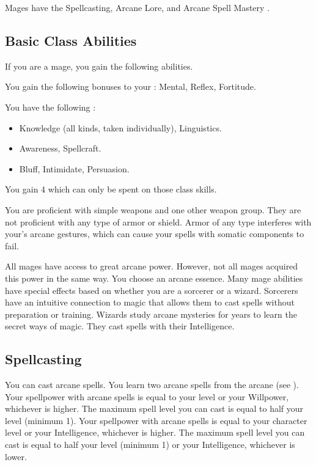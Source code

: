      Mages have the Spellcasting, Arcane Lore, and Arcane Spell Mastery .

    \subsection{Basic Class Abilities}
        If you are a mage, you gain the following abilities.

        You gain the following bonuses to your :  Mental,  Reflex,  Fortitude.

        You have the following :
        \begin{itemize}
            \item {} Knowledge (all kinds, taken individually), Linguistics.
            \item {} Awareness, Spellcraft.
            \item {} Bluff, Intimidate, Persuasion.
        \end{itemize}
        You gain 4  which can only be spent on those class skills.

        You are proficient with simple weapons and one other weapon group.
        They are not proficient with any type of armor or shield.
        Armor of any type interferes with your's arcane gestures, which can cause your spells with somatic components to fail.

        All mages have access to great arcane power.
        However, not all mages acquired this power in the same way.
        You choose an arcane essence.
        Many mage abilities have special effects based on whether you are a sorcerer or a wizard.
         Sorcerers have an intuitive connection to magic that allows them to cast spells without preparation or training.
         Wizards study arcane mysteries for years to learn the secret ways of magic.
        They cast spells with their Intelligence.

    \subsection{Spellcasting}

        You can cast arcane spells.
        You learn two arcane spells from the arcane  (see ).
         Your spellpower with arcane spells is equal to your level or your Willpower, whichever is higher.
        The maximum spell level you can cast is equal to half your level (minimum 1).
         Your spellpower with arcane spells is equal to your character level or your Intelligence, whichever is higher.
        The maximum spell level you can cast is equal to half your level (minimum 1) or your Intelligence, whichever is lower.

